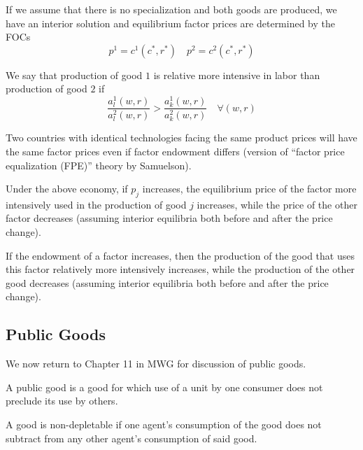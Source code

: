 If we assume that there is no specialization and both goods are
produced, we have an interior solution and equilibrium factor prices
are determined by the FOCs
\[
p^1 = c^1(c^*, r^*) \quad p^2 = c^2(c^*, r^*)
\]


\begin{definition}
  We say that production of good $1$ is relative more intensive in
  labor than production of good $2$ if 
  \[
  \frac{a^1_l(w,r)}{a^2_l(w,r)} > \frac{a^1_k(w,r)}{a^2_k(w,r)}
  \quad \forall (w,r)
  \]
\end{definition}


\begin{theorem}[Samuelson 1949]
  Two countries with identical technologies facing the same product
  prices will have the same factor prices even if factor endowment
  differs (version of ``factor price equalization (FPE)'' theory by
  Samuelson).
\end{theorem}

\begin{theorem}
  Under the above economy, if $p_j$ increases, the equilibrium price
  of the factor more intensively used in the production of good $j$
  increases, while the price of the other factor decreases (assuming
  interior equilibria both before and after the price change).
\end{theorem}

\begin{theorem}
  If the endowment of a factor increases, then the production of the
  good that uses this factor relatively more intensively increases,
  while the production of the other good decreases (assuming interior
  equilibria both before and after the price change).
\end{theorem}



\subsection{Public Goods}
\label{sec:public-goods}

We now return to Chapter 11 in MWG for discussion of public goods.

\begin{definition}
  A public good is a good for which use of a unit by one consumer does
  not preclude its use by others.
\end{definition}

\begin{definition}
  A good is non-depletable if one agent's consumption of the good does
  not subtract from any other agent's consumption of said good.
\end{definition}

